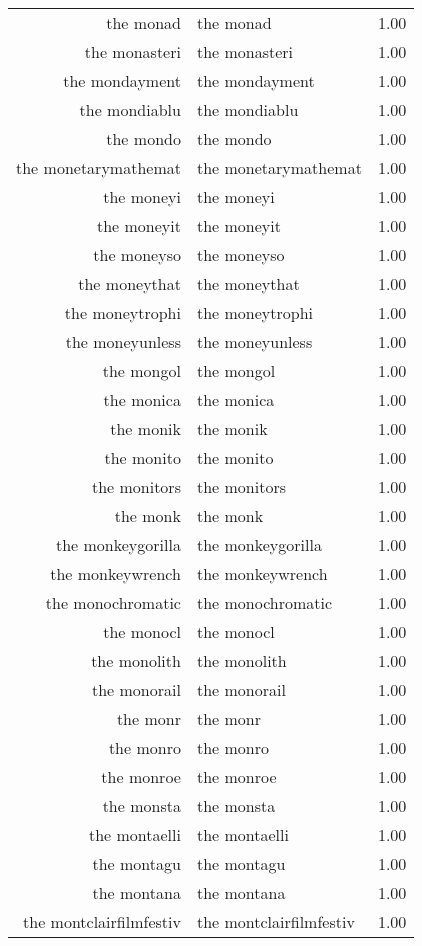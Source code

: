 \begin{table}[ht]
\begin{tabular}{rlr}
  the monad & the monad & 1.00 \\ 
  the monasteri & the monasteri & 1.00 \\ 
  the mondayment & the mondayment & 1.00 \\ 
  the mondiablu & the mondiablu & 1.00 \\ 
  the mondo & the mondo & 1.00 \\ 
  the monetarymathemat & the monetarymathemat & 1.00 \\ 
  the moneyi & the moneyi & 1.00 \\ 
  the moneyit & the moneyit & 1.00 \\ 
  the moneyso & the moneyso & 1.00 \\ 
  the moneythat & the moneythat & 1.00 \\ 
  the moneytrophi & the moneytrophi & 1.00 \\ 
  the moneyunless & the moneyunless & 1.00 \\ 
  the mongol & the mongol & 1.00 \\ 
  the monica & the monica & 1.00 \\ 
  the monik & the monik & 1.00 \\ 
  the monito & the monito & 1.00 \\ 
  the monitors & the monitors & 1.00 \\ 
  the monk & the monk & 1.00 \\ 
  the monkeygorilla & the monkeygorilla & 1.00 \\ 
  the monkeywrench & the monkeywrench & 1.00 \\ 
  the monochromatic & the monochromatic & 1.00 \\ 
  the monocl & the monocl & 1.00 \\ 
  the monolith & the monolith & 1.00 \\ 
  the monorail & the monorail & 1.00 \\ 
  the monr & the monr & 1.00 \\ 
  the monro & the monro & 1.00 \\ 
  the monroe & the monroe & 1.00 \\ 
  the monsta & the monsta & 1.00 \\ 
  the montaelli & the montaelli & 1.00 \\ 
  the montagu & the montagu & 1.00 \\ 
  the montana & the montana & 1.00 \\ 
  the montclairfilmfestiv & the montclairfilmfestiv & 1.00 \\ 

\end{tabular}
\end{table}
